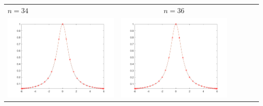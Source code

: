 \begin{tabular}{l*{5}{c}}
\hspace{3.5cm}\(n=34\) &  \(n=36\) \\
\includegraphics[scale=0.5]{cap4/4_7/34.png} &  \includegraphics[scale=0.5]{cap4/4_7/36.png} \\


\end{tabular}
